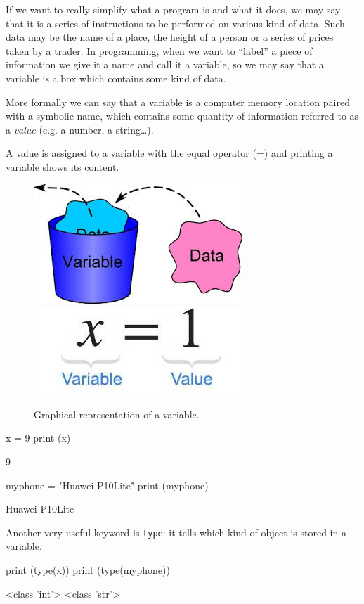 If we want to really simplify what a program is and what it does, we may say that it is a series of instructions to be performed on various kind of data. Such data may be the name of a place, the height of a person or a series of prices taken by a trader. In programming, when we want to “label” a piece of information we give it a name and call it a variable, so we may say that a variable is a box which contains some kind of data.

More formally we can say that a variable is a computer memory location paired with a symbolic name, which contains some quantity of information referred to as a \emph{value} (e.g. a number, a string\ldots). 

A value is assigned to a variable with the equal operator (=) and printing a variable shows its content. 

\begin{figure}[h]
\centering
\includegraphics[width=0.35\linewidth]{figures/var1.jpeg}\\
\includegraphics[width=0.35\linewidth]{figures/var2.jpeg}
\caption{Graphical representation of a variable.}
\end{figure}

\begin{ipython}
x = 9 
print (x)
\end{ipython}
\begin{ioutput}
9
\end{ioutput}
\begin{ipython}
myphone = "Huawei P10Lite" 
print (myphone)
\end{ipython}
\begin{ioutput}
Huawei P10Lite	
\end{ioutput}

Another very useful keyword is \texttt{type}: it tells which kind of object is stored in a variable.

\begin{ipython}
print (type(x))
print (type(myphone))
\end{ipython}
\begin{ioutput}
<class 'int'>
<class 'str'>
\end{ioutput}

